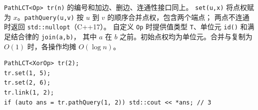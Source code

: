 \verb|PathLCT<Op> tr(n)| 的编号和加边、删边、连通性接口同上。
\verb|set(u,x)| 将点权赋为 $x$。\verb|pathQuery(u,v)| 按 $u$ 到 $v$ 的顺序合并点权，包含两个端点；
两点不连通时返回 \verb|std::nullopt|（C++17）。
自定义 \verb|Op| 时提供值类型 \verb|T|、单位元 \verb|id()| 和满足结合律的 \verb|join(a,b)|，
其中 $a$ 在 $b$ 之前。初始点权均为单位元。合并与复制为 $O(1)$ 时，各操作均摊 $O(\log n)$。

\begin{verbatim}
PathLCT<XorOp> tr(2);
tr.set(1, 5);
tr.set(2, 6);
tr.link(1, 2);
if (auto ans = tr.pathQuery(1, 2)) std::cout << *ans; // 3
\end{verbatim}
